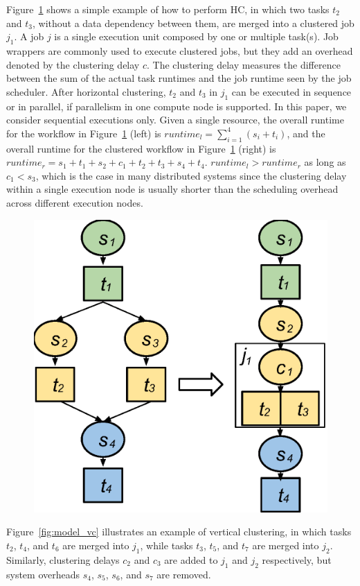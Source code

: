 \documentclass[final,5p,times,twocolumn]{elsarticle}
\begin{document}
Figure~\ref{fig:model_hc} shows a simple example of how to perform HC, in which two tasks $t_2$ and $t_3$, without a data dependency between them, are merged into a clustered job $j_1$. A job $j$ is a single execution unit composed by one or multiple task(s). Job wrappers are commonly used to execute clustered jobs, but they add an overhead denoted by the clustering delay $c$. The clustering delay measures the difference between the sum of the actual task runtimes and the job runtime seen by the job scheduler. 
After horizontal clustering, $t_2$ and $t_3$ in $j_1$ can be executed in sequence or in parallel, if parallelism in one compute node is supported. In this paper, we consider sequential executions only. Given a single resource, the overall runtime for the workflow in Figure~\ref{fig:model_hc} (left) is $runtime_l= \sum_{i=1}^{4}(s_i+t_i)$, and the overall runtime for the clustered workflow in Figure~\ref{fig:model_hc} (right) is $runtime_r=s_1+t_1+s_2+c_1+t_2+t_3+s_4+t_4$.  $runtime_l > runtime_r$ as long as $c_1 < s_3$, which is the case in many distributed systems since the clustering delay within a single execution node is usually shorter than the scheduling overhead across different execution nodes. 

\begin{figure}[!htb]
\centering
 \includegraphics[width=0.5\linewidth]{figure3.eps}
  \label{fig:model_hc}
\end{figure}

Figure~\ref{fig:model_vc} illustrates an example of vertical clustering, in which tasks $t_2$, $t_4$, and $t_6$ are merged into $j_1$, while tasks $t_3$, $t_5$, and $t_7$ are merged into $j_2$. Similarly, clustering delays $c_2$ and $c_3$ are added to $j_1$ and $j_2$ respectively, but system overheads $s_4$, $s_5$, $s_6$, and $s_7$ are removed. 
\end{document}
